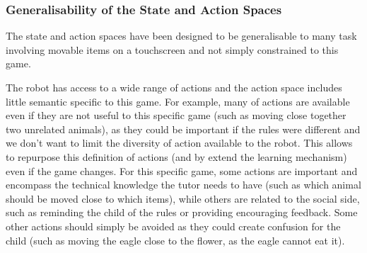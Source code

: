 

\subsubsection{Generalisability of the State and Action Spaces} \label{sec:tuto_general}

The state and action spaces have been designed to be generalisable to many task involving movable items on a touchscreen and not simply constrained to this game. 

The robot has access to a wide range of actions and the action space includes little semantic specific to this game. For example, many of actions are available even if they are not useful to this specific game (such as moving close together two unrelated animals), as they could be important if the rules were different and we don't want to limit the diversity of action available to the robot. This allows to repurpose this definition of actions (and by extend the learning mechanism) even if the game changes. For this specific game, some actions are important and encompass the technical knowledge the tutor needs to have (such as which animal should be moved close to which items), while others are related to the social side, such as reminding the child of the rules or providing encouraging feedback. Some other actions should simply be avoided as they could create confusion for the child (such as moving the eagle close to the flower, as the eagle cannot eat it). 

